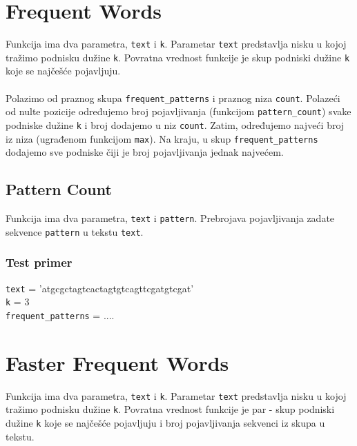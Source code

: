 \section{Frequent Words}

Funkcija ima dva parametra, \texttt{text} i \texttt{k}. Parametar \texttt{text} predstavlja nisku u kojoj tražimo podnisku dužine \texttt{k}. Povratna vrednost funkcije je skup podniski dužine \texttt{k} koje se najčešće pojavljuju.
\\
\\
Polazimo od praznog skupa \texttt{frequent\_patterns} i praznog niza \texttt{count}. Polazeći od nulte pozicije određujemo broj pojavljivanja (funkcijom \texttt{pattern\_count}) svake podniske dužine \texttt{k} i broj dodajemo u niz \texttt{count}. Zatim, određujemo najveći broj iz niza (ugrađenom funkcijom \texttt{max}). Na kraju, u skup \texttt{frequent\_patterns} dodajemo sve podniske čiji je broj pojavljivanja jednak najvećem.




\subsection{Pattern Count}

Funkcija ima dva parametra, \texttt{text} i \texttt{pattern}. Prebrojava pojavljivanja zadate sekvence \texttt{pattern} u tekstu \texttt{text}. 



\subsubsection{Test primer}
\noindent\texttt{text} = 'atgcgctagtcactagtgtcagttcgatgtcgat'
\\\texttt{k} = 3
\\\texttt{frequent\_patterns} = ....


\section{Faster Frequent Words}

Funkcija ima dva parametra, \texttt{text} i \texttt{k}. Parametar \texttt{text} predstavlja nisku u kojoj tražimo podnisku dužine \texttt{k}. Povratna vrednost funkcije je par - skup podniski dužine \texttt{k} koje se najčešće pojavljuju i broj pojavljivanja sekvenci iz skupa u tekstu. 

